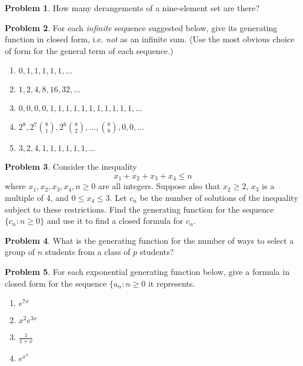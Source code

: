 \documentclass[12pt]{article}
\newcounter{chapternumber}
\theoremstyle{definition}
\newtheorem{problem-internal}{Problem}[chapternumber]
\newenvironment{problem}{
  \medskip
  \begin{problem-internal}
}{
\end{problem-internal}
}
\begin{document}
  \setcounter{problem-internal}{18}
  \begin{problem}
    How many derangements of a nine-element set are there?
  \end{problem}


  \setcounter{chapternumber}{8}
  \setcounter{problem-internal}{1}
  \begin{problem}
    For each \textit{infinite} sequence suggested below, give its generating function in closed form, i.e. \textit{not} as an infinite sum.
    (Use the most obvious choice of form for the general term of each sequence.)
    \begin{enumerate}[label={\alph*.}]
      \item \(0, 1, 1, 1, 1, 1, \ldots\)
      \item \(1, 2, 4, 8, 16, 32, \ldots\)
      \item \(0, 0, 0, 0, 1, 1, 1, 1, 1, 1, 1, 1, 1, 1, 1, \ldots\)
      \item \(2^{8}, 2^{7} {8 \choose 1}, 2^{6} {8 \choose 2}, \ldots, {8 \choose 8}, 0, 0, \ldots\)
      \item \(3, 2, 4, 1, 1, 1, 1, 1, 1, \ldots\)
    \end{enumerate}
  \end{problem}


  \setcounter{problem-internal}{6}
  \begin{problem}
    Consider the inequality
    \begin{equation*}
      x_{1} + x_{2} + x_{3} + x_{4} \leq n
    \end{equation*}
    where \(x_{1}, x_{2}, x_{3}, x_{4}, n \geq 0\) are all integers.
    Suppose also that \(x_{2} \geq 2\), \(x_{3}\) is a multiple of 4, and \(0 \leq x_{4} \leq 3\).
    Let \(c_{n}\) be the number of solutions of the inequality subject to these restrictions.
    Find the generating function for the sequence \(\{c_{n}: n \geq 0\}\) and use it to find a closed formula for \(c_{n}\).
  \end{problem}


  \setcounter{problem-internal}{8}
  \begin{problem}
    What is the generating function for the number of ways to select a group of \(n\) students from a class of \(p\) students?
  \end{problem}


  \begin{problem}
    For each exponential generating function below, give a formula in closed form for the sequence \(\{a_{n}: n \geq 0\) it represents.
    \begin{enumerate}[label={\alph*.}]
      \item \(e^{7x}\)
      \item \(x^{2} e^{3x}\)
      \item \(\frac{1}{1+x}\)
      \item \(e^{x^{4}}\)
    \end{enumerate}
  \end{problem}
\end{document}
